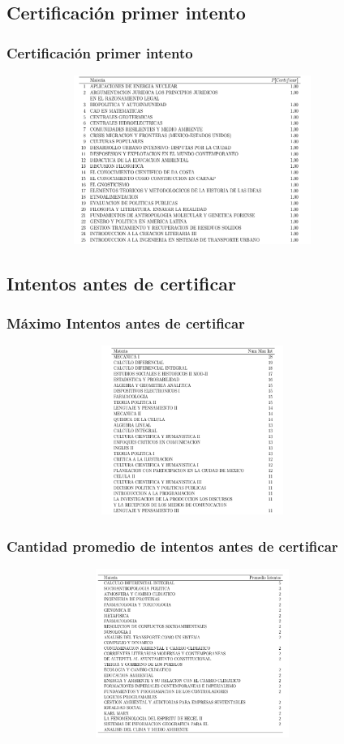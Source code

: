 \documentclass[xcolor=dvipsnames]{beamer}
\begin{document}
\subsection{Certificaci\'on primer intento}

\begin{frame}\frametitle{Certificaci\'on primer intento}
\begin{figure}[H]
\centering
\includegraphics[width=10cm,height=5.5cm]{Tablas/MateriasCertPrimera.png}
\end{figure}
\end{frame}

\subsection{Intentos antes de certificar}

\begin{frame}\frametitle{M\'aximo Intentos antes de certificar}
\begin{figure}[H]
\centering
\includegraphics[width=10cm,height=5.5cm]{Tablas/MateriasMaxIntSiCert.png}
\end{figure}
\end{frame}


\begin{frame}\frametitle{Cantidad promedio de intentos antes de certificar}
\begin{figure}[H]
\centering
\includegraphics[width=10cm,height=5.5cm]{Tablas/MateriasPromSiCert.png}
\end{figure}
\end{frame}
\end{document}
